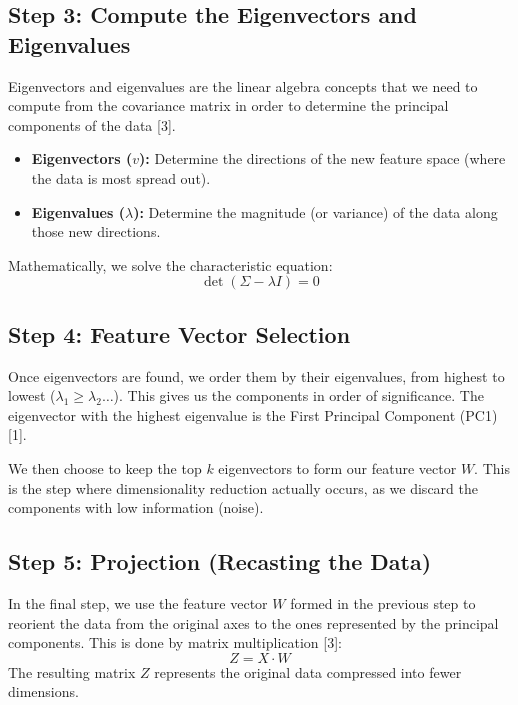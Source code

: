 \documentclass[12pt, a4paper]{report}
\begin{document}
\subsection{Step 3: Compute the Eigenvectors and Eigenvalues}
Eigenvectors and eigenvalues are the linear algebra concepts that we need to compute from the covariance matrix in order to determine the principal components of the data [3].
\begin{itemize}
    \item \textbf{Eigenvectors ($v$):} Determine the directions of the new feature space (where the data is most spread out).
    \item \textbf{Eigenvalues ($\lambda$):} Determine the magnitude (or variance) of the data along those new directions.
\end{itemize}
Mathematically, we solve the characteristic equation:
\begin{equation}
    \det(\Sigma - \lambda I) = 0
\end{equation}

\subsection{Step 4: Feature Vector Selection}
Once eigenvectors are found, we order them by their eigenvalues, from highest to lowest ($\lambda_1 \geq \lambda_2 \dots$). This gives us the components in order of significance. The eigenvector with the highest eigenvalue is the First Principal Component (PC1) [1].

We then choose to keep the top $k$ eigenvectors to form our feature vector $W$. This is the step where dimensionality reduction actually occurs, as we discard the components with low information (noise).

\subsection{Step 5: Projection (Recasting the Data)}
In the final step, we use the feature vector $W$ formed in the previous step to reorient the data from the original axes to the ones represented by the principal components. This is done by matrix multiplication [3]:
\begin{equation}
    Z = X \cdot W
\end{equation}
The resulting matrix $Z$ represents the original data compressed into fewer dimensions.

\newpage
\end{document}
